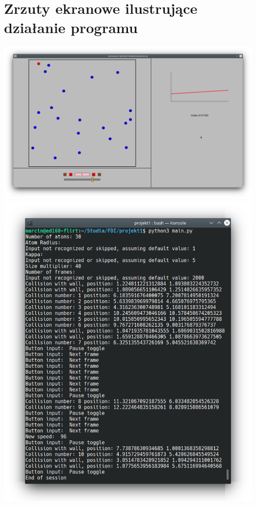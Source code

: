 \documentclass{article}
\begin{document}
\section{Zrzuty ekranowe ilustrujące działanie programu}
    \includegraphics[width=\textwidth]{Screenshot 1.png}\\
    
    \includegraphics[width=\textwidth]{Screenshot 2b.png}\\
\end{document}
